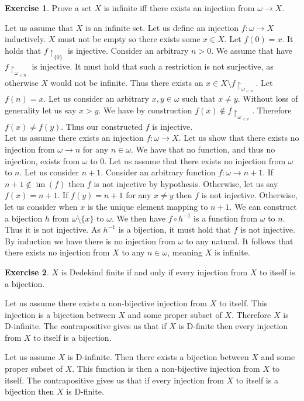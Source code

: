 \documentclass{article}
\theoremstyle{definition}
\newtheorem{exer}{Exercise}[section]
\DeclareMathOperator{\im}{im}
\newlength{\defparindent}
\newenvironment{answer}
    {\begin{mdframed}[backgroundcolor=gray!15, linewidth=0pt] \setlength{\parindent}{\defparindent}}
    {\end{mdframed}}
\begin{document}
\begin{exer}
    Prove a set $X$ is infinite iff there exists an injection from $\omega \to X$.

    \begin{answer}
        Let us assume that $X$ is an infinite set. Let us define an injection $f: \omega \to X$ inductively. $X$ must not be empty so there exists some $x \in X$. Let $f(0) = x$. It holds that $f\restriction_{\{0\}}$ is injective. Consider an arbitrary $n > 0$. We assume that have $f \restriction_{\omega_{< n}}$ is injective. It must hold that such a restriction is not surjective, as otherwise $X$ would not be infinite. Thus there exists an $x \in X \setminus f \restriction_{\omega_{< n}}$. Let $f(n) = x$. Let us consider an arbitrary $x, y \in \omega$ such that $x \ne y$. Without loss of generality let us say $x > y$. We have by construction $f(x) \not\in f\restriction_{\omega_{< x}}$. Therefore $f(x) \ne f(y)$. Thus our constructed $f$ is injective.
        \\[.1cm]
        Let us assume there exists an injection $f: \omega \to X$. Let us show that there exists no injection from $\omega \to n$ for any $n \in \omega$. We have that no function, and thus no injection, exists from $\omega$ to $0$. Let us assume that there exists no injection from $\omega$ to $n$. Let us consider $n + 1$. Consider an arbitrary function $f: \omega \to n + 1$. If $n + 1 \not\in \im(f)$ then $f$ is not injective by hypothesis. Otherwise, let us say $f(x) = n + 1$. If $f(y) = n + 1$  for any $x \ne y$ then $f$ is not injective. Otherwise, let us consider when $x$ is the unique element mapping to $n + 1$. We can construct a bijection $h$ from $\omega \setminus \{x\}$ to $\omega$. We then have $f \circ h^{-1}$ is a function from $\omega$ to $n$. Thus it is not injective. As $h^{-1}$ is a bijection, it must hold that $f$ is not injective. By induction we have there is no injection from $\omega$ to any natural. It follows that there exists no injection from $X$ to any $n \in \omega$, meaning $X$ is infinite. 
    \end{answer}
\end{exer}

\begin{exer}
    $X$ is Dedekind finite if and only if every injection from $X$ to itself is a bijection.
    \begin{answer}
        Let us assume there exists a  non-bijective injection from $X$ to itself. This injection is a bijection between $X$ and some proper subset of $X$. Therefore $X$ is D-infinite. The contrapositive gives us that if $X$ is D-finite then every injection from $X$ to itself is a bijection.

        Let us assume $X$ is D-infinite. Then there exists a bijection between $X$ and some proper subset of $X$. This function is then a non-bijective injection from $X$ to itself. The contrapositive gives us that if every injection from $X$ to itself is a bijection then $X$ is D-finite.
    \end{answer}
\end{exer}
\end{document}
